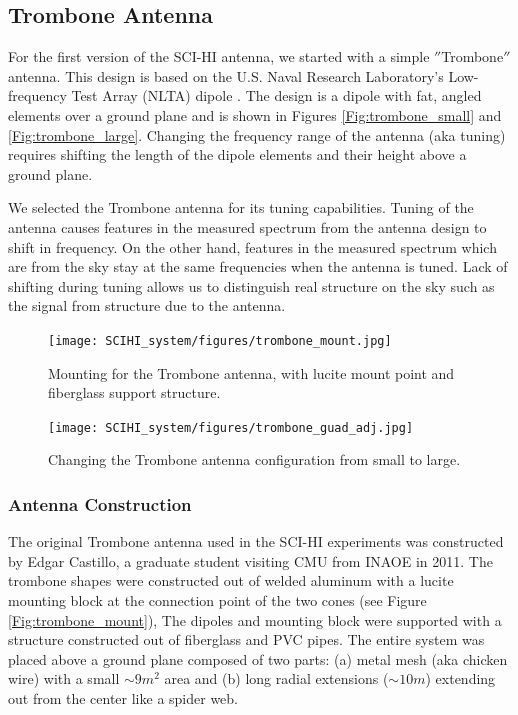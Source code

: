 \subsection{Trombone Antenna}

For the first version of the SCI-HI antenna, we started with a simple $''$Trombone$''$ antenna. This design is based on the U.S. Naval Research Laboratory's Low-frequency Test Array (NLTA) dipole \cite{ellingson_2005}. The design is a dipole with fat, angled elements over a ground plane and is shown in Figures \ref{Fig:trombone_small} and \ref{Fig:trombone_large}. Changing the frequency range of the antenna (aka tuning) requires shifting the length of the dipole elements and their height above a ground plane. 

We selected the Trombone antenna for its tuning capabilities. Tuning of the antenna causes features in the measured spectrum from the antenna design to shift in frequency. On the other hand, features in the measured spectrum which are from the sky stay at the same frequencies when the antenna is tuned. Lack of shifting during tuning allows us to distinguish real structure on the sky such as the \cm signal from structure due to the antenna. 

\begin{figure}[htb]
\centering
\begin{minipage}[b]{0.53\textwidth}
\centering
\texttt{[image: SCIHI\_system/figures/trombone\_mount.jpg]}
\caption{Mounting for the Trombone antenna, with lucite mount point and fiberglass support structure. }
\label{Fig:trombone_mount}
\end{minipage}%
\begin{minipage}[b]{0.02\textwidth}
\hspace{1cm}
\end{minipage}%
\begin{minipage}[b]{0.41\textwidth}
\centering
\texttt{[image: SCIHI\_system/figures/trombone\_guad\_adj.jpg]}
\caption{Changing the Trombone antenna configuration from small to large.}
\label{Fig:trombone_adj}
\end{minipage}
\end{figure}

\subsubsection{Antenna Construction}

The original Trombone antenna used in the SCI-HI experiments was constructed by Edgar Castillo, a graduate student visiting CMU from INAOE in 2011. The trombone shapes were constructed out of welded aluminum with a lucite mounting block at the connection point of the two cones (see Figure \ref{Fig:trombone_mount}), The dipoles and mounting block were supported with a structure constructed out of fiberglass and PVC pipes. The entire system was placed above a ground plane composed of two parts: (a) metal mesh (aka chicken wire) with a small $\sim9 m^2$ area and (b) long radial extensions ($\sim10 m$) extending out from the center like a spider web. 

